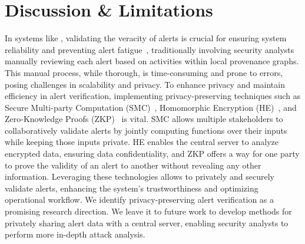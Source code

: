 \section{Discussion \& Limitations}
\label{sec:discussion}




%

 In systems like \Sys, validating the veracity of alerts is crucial for ensuring system reliability and preventing alert fatigue~\cite{nodoze2019}, traditionally involving security analysts manually reviewing each alert based on activities within local provenance graphs. This manual process, while thorough, is time-consuming and prone to errors, posing challenges in scalability and privacy. To enhance privacy and maintain efficiency in alert verification, implementing privacy-preserving techniques such as Secure Multi-party Computation (SMC)~\cite{goldreich1998secure}, Homomorphic Encryption (HE)~\cite{yi2014homomorphic}, and Zero-Knowledge Proofs (ZKP)~\cite{fiege1987zero} is vital. SMC allows multiple stakeholders to collaboratively validate alerts by jointly computing functions over their inputs while keeping those inputs private. HE enables the central server to analyze encrypted data, ensuring data confidentiality, and ZKP offers a way for one party to prove the validity of an alert to another without revealing any other information. Leveraging these technologies allows \Sys to privately and securely validate alerts, enhancing the system's trustworthiness and optimizing operational workflow. We identify privacy-preserving alert verification as a promising research direction. We leave it to future work to develop methods for privately sharing alert data with a central server, enabling security analysts to perform more in-depth attack analysis.

